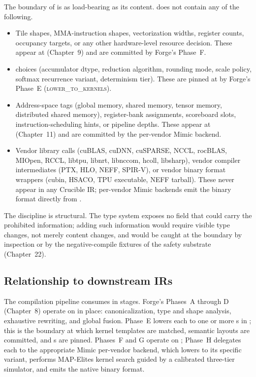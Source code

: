 The boundary of  is as load-bearing as its content.
 does not contain any of the following.

\begin{itemize}
  \item Tile shapes, MMA-instruction shapes, vectorization widths, register counts, occupancy targets, or any other hardware-level resource decision.
        These appear at  (Chapter~9) and are committed by Forge's Phase~F.
  \item {} choices (accumulator dtype, reduction algorithm, rounding mode, scale policy, softmax recurrence variant, determinism tier).
        These are pinned at  by Forge's Phase~E (\textsc{lower\_to\_kernels}).
  \item Address-space tags (global memory, shared memory, tensor memory, distributed shared memory), register-bank assignments, scoreboard slots, instruction-scheduling hints, or pipeline depths.
        These appear at  (Chapter~11) and are committed by the per-vendor Mimic backend.
  \item Vendor library calls (cuBLAS, cuDNN, cuSPARSE, NCCL, rocBLAS, MIOpen, RCCL, libtpu, libnrt, libnccom, hcoll, libsharp), vendor compiler intermediates (PTX, HLO, NEFF, SPIR-V), or vendor binary format wrappers (cubin, HSACO, TPU executable, NEFF tarball).
        These never appear in any Crucible IR; per-vendor Mimic backends emit the binary format directly from .
\end{itemize}

The discipline is structural.
The  type system exposes no field that could carry the prohibited information; adding such information would require visible type changes, not merely content changes, and would be caught at the boundary by inspection or by the negative-compile fixtures of the safety substrate (Chapter~22).

\subsection{Relationship to downstream IRs}
\label{sec:ir001-downstream}

The compilation pipeline consumes  in stages.
Forge's Phases~A through D (Chapter~8) operate on  in place: canonicalization, type and shape analysis, exhaustive rewriting, and global fusion.
Phase~E lowers each  to one or more s in ; this is the boundary at which kernel templates are matched, semantic layouts are committed, and s are pinned.
Phases~F and G operate on ; Phase~H delegates each  to the appropriate Mimic per-vendor backend, which lowers  to its specific  variant, performs MAP-Elites kernel search guided by a calibrated three-tier simulator, and emits the native binary format.


